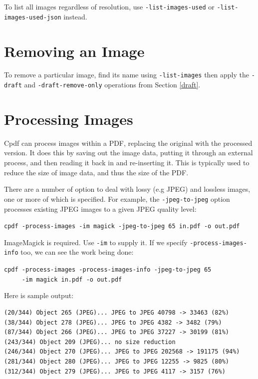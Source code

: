 \documentclass{book}
\begin{document}
\noindent To list all images regardless of resolution, use \texttt{-list-images-used} or \texttt{-list-images-used-json} instead.

\section{Removing an Image}

To remove a particular image, find its name using \texttt{-list-images} then apply the \texttt{-draft} and \texttt{-draft-remove-only} operations from Section \ref{draft}. 

\section{Processing Images}

Cpdf can process images within a PDF, replacing the original with the processed version. It does this by saving out the image data, putting it through an external process, and then reading it back in and re-inserting it. This is typically used to reduce the size of image data, and thus the size of the PDF.

There are a number of option to deal with lossy (e.g JPEG) and lossless images, one or more of which is specified. For example, the \texttt{-jpeg-to-jpeg} option processes existing JPEG images to a given JPEG quality level:

  \begin{framed}
  \noindent\small\verb!cpdf -process-images -im magick -jpeg-to-jpeg 65 in.pdf -o out.pdf!
  \end{framed}

\noindent ImageMagick is required. Use \texttt{-im} to supply it. If we specify \texttt{-process-images-info} too, we can see the work being done:

  \begin{framed}
  \noindent\small\verb!cpdf -process-images -process-images-info -jpeg-to-jpeg 65!\\
  \noindent\small\verb!     -im magick in.pdf -o out.pdf!
  \end{framed}

\noindent Here is sample output:

\begin{framed}
{\small\begin{verbatim}
(20/344) Object 265 (JPEG)... JPEG to JPEG 40798 -> 33463 (82%)
(38/344) Object 278 (JPEG)... JPEG to JPEG 4382 -> 3482 (79%)
(87/344) Object 266 (JPEG)... JPEG to JPEG 37227 -> 30199 (81%)
(243/344) Object 209 (JPEG)... no size reduction
(246/344) Object 270 (JPEG)... JPEG to JPEG 202568 -> 191175 (94%)
(281/344) Object 280 (JPEG)... JPEG to JPEG 12255 -> 9825 (80%)
(312/344) Object 279 (JPEG)... JPEG to JPEG 4117 -> 3157 (76%)
\end{verbatim}}
  \end{framed}
\end{document}
